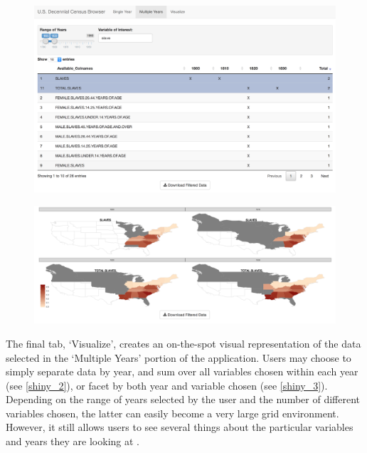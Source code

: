 \documentclass[DIV=calc, paper=a4, fontsize=10pt, twocolumn]{scrartcl}\usepackage[]{graphicx}\usepackage[]{color}
\begin{document}
\begin{figure}[hbtp]
\includegraphics[width=.48\textwidth]{./figures/search_slaves_40years.png}  
\label{shiny_1}
\end{figure}

\begin{figure}[hbtp]
\centering
\includegraphics[width=.48\textwidth]{./figures/visualize_slaves_40years_sum.png}  
\label{shiny_2}
\end{figure}

\par The final tab, `Visualize', creates an on-the-spot visual representation of the data selected in the `Multiple Years' portion of the application. Users may choose to simply separate data by year, and sum over all variables chosen within each year (see \autoref{shiny_2}), or facet by both year and variable chosen (see \autoref{shiny_3}). Depending on the range of years selected by the user and the number of different variables chosen, the latter can easily become a very large grid environment. However, it still allows users to see several things about the particular variables and years they are looking at .
\end{document}
